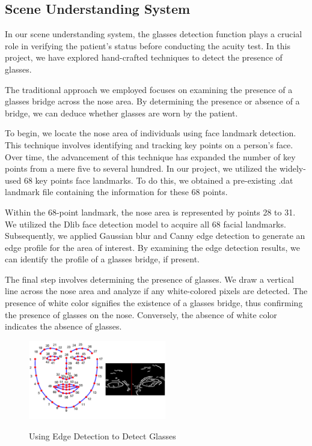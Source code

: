 \documentclass{article}
\begin{document}
\subsection{Scene Understanding System}
In our scene understanding system, the glasses detection function plays a crucial role in verifying the patient's status before conducting the acuity test. In this project, we have explored hand-crafted techniques to detect the presence of glasses.

The traditional approach we employed focuses on examining the presence of a glasses bridge across the nose area. By determining the presence or absence of a bridge, we can deduce whether glasses are worn by the patient.

To begin, we locate the nose area of individuals using face landmark detection. This technique involves identifying and tracking key points on a person's face. Over time, the advancement of this technique has expanded the number of key points from a mere five to several hundred. In our project, we utilized the widely-used 68 key points face landmarks. To do this, we obtained a pre-existing .dat landmark file containing the information for these 68 points.

Within the 68-point landmark, the nose area is represented by points 28 to 31. We utilized the Dlib face detection model to acquire all 68 facial landmarks. Subsequently, we applied Gaussian blur and Canny edge detection to generate an edge profile for the area of interest. By examining the edge detection results, we can identify the profile of a glasses bridge, if present.

The final step involves determining the presence of glasses. We draw a vertical line across the nose area and analyze if any white-colored pixels are detected. The presence of white color signifies the existence of a glasses bridge, thus confirming the presence of glasses on the nose. Conversely, the absence of white color indicates the absence of glasses.

\begin{figure}[tbh]
    \begin{center}
        \includegraphics[width=6cm]{glasses-detection.png}\
        \caption{Using Edge Detection to Detect Glasses\label{glasses-detection}} 
    \end{center}
\end{figure}
\end{document}
